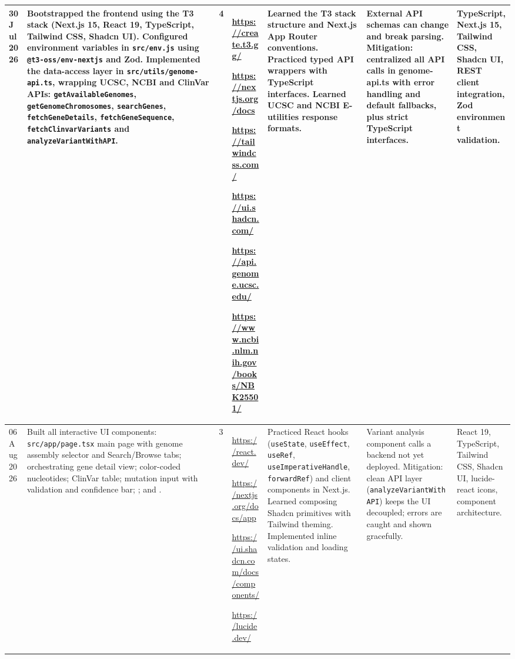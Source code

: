 \documentclass[8pt,a4paper]{article}
\begin{document}
\begin{longtable}{|
    D{1.25cm}|
    D{4.10cm}|
    D{0.70cm}|
    D{2.90cm}|
    D{2.90cm}|
    D{3.00cm}|
    D{2.95cm}|
}
30 Jul 2026 &
Bootstrapped the frontend using the T3 stack (Next.js 15, React 19, TypeScript, Tailwind CSS, Shadcn UI). Configured environment variables in \texttt{src/env.js} using \texttt{@t3-oss/env-nextjs} and Zod. Implemented the data-access layer in \texttt{src/utils/genome-api.ts}, wrapping UCSC, NCBI and ClinVar APIs: \texttt{getAvailableGenomes}, \texttt{getGenomeChromosomes}, \texttt{searchGenes}, \texttt{fetchGeneDetails}, \texttt{fetchGeneSequence}, \texttt{fetchClinvarVariants} and \texttt{analyzeVariantWithAPI}. &
4 &
\url{https://create.t3.gg/}
\par
\url{https://nextjs.org/docs}
\par
\url{https://tailwindcss.com/}
\par
\url{https://ui.shadcn.com/}
\par
\url{https://api.genome.ucsc.edu/}
\par
\url{https://www.ncbi.nlm.nih.gov/books/NBK25501/}
&
Learned the T3 stack structure and Next.js App Router conventions. Practiced typed API wrappers with TypeScript interfaces. Learned UCSC and NCBI E-utilities response formats. &
External API schemas can change and break parsing. Mitigation: centralized all API calls in genome-api.ts with error handling and default fallbacks, plus strict TypeScript interfaces. &
TypeScript, Next.js 15, Tailwind CSS, Shadcn UI, REST client integration, Zod environment validation. \\
\hline

06 Aug 2026 &
Built all interactive UI components: \texttt{src/app/page.tsx} main page with genome assembly selector and Search/Browse tabs;  orchestrating gene detail view;  color-coded nucleotides;  ClinVar table;  mutation input with validation and confidence bar; ; and . &
3 &
\url{https://react.dev/}
\par
\url{https://nextjs.org/docs/app}
\par
\url{https://ui.shadcn.com/docs/components/}
\par
\url{https://lucide.dev/}
&
Practiced React hooks (\texttt{useState}, \texttt{useEffect}, \texttt{useRef}, \texttt{useImperative\allowbreak Handle}, \texttt{forwardRef}) and client components in Next.js. Learned composing Shadcn primitives with Tailwind theming. Implemented inline validation and loading states. &
Variant analysis component calls a backend not yet deployed. Mitigation: clean API layer (\texttt{analyze\allowbreak VariantWith\allowbreak API}) keeps the UI decoupled; errors are caught and shown gracefully. &
React 19, TypeScript, Tailwind CSS, Shadcn UI, lucide-react icons, component architecture. \\
\hline


\end{longtable}
\end{document}
